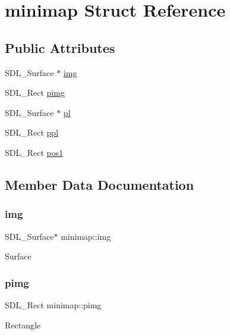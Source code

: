 \hypertarget{structminimap}{}\section{minimap Struct Reference}
\label{structminimap}
\subsection*{Public Attributes}
\begin{DoxyCompactItemize}
\item 
S\+D\+L\+\_\+\+Surface $\ast$ \hyperlink{structminimap_a9a312ac8cf080f717e99aa522017cbe1}{img}
\item 
S\+D\+L\+\_\+\+Rect \hyperlink{structminimap_aa18a21745c49e92e89b7c4dadafa5d9f}{pimg}
\item 
S\+D\+L\+\_\+\+Surface $\ast$ \hyperlink{structminimap_a878126c86a5c3bd571c7e011e8c0aa2e}{pl}
\item 
S\+D\+L\+\_\+\+Rect \hyperlink{structminimap_a33921f629e99a7f31dcfc4c4e58e6fe2}{ppl}
\item 
S\+D\+L\+\_\+\+Rect \hyperlink{structminimap_a40bafd4b39aa3bc4ac940a42b384005c}{pos1}
\end{DoxyCompactItemize}


\subsection{Member Data Documentation}
\mbox{\label{structminimap_a9a312ac8cf080f717e99aa522017cbe1}} 
\subsubsection{\texorpdfstring{img}{img}}
{\footnotesize\ttfamily S\+D\+L\+\_\+\+Surface$\ast$ minimap\+::img}

Surface \mbox{\label{structminimap_aa18a21745c49e92e89b7c4dadafa5d9f}} 
\subsubsection{\texorpdfstring{pimg}{pimg}}
{\footnotesize\ttfamily S\+D\+L\+\_\+\+Rect minimap\+::pimg}

Rectangle \mbox{\label{structminimap_a878126c86a5c3bd571c7e011e8c0aa2e}} 
